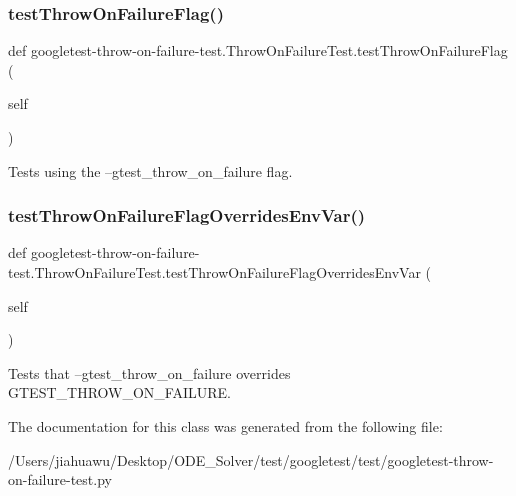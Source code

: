 \subsubsection{\texorpdfstring{test\+Throw\+On\+Failure\+Flag()}{testThrowOnFailureFlag()}}
{\footnotesize\ttfamily def googletest-\/throw-\/on-\/failure-\/test.\+Throw\+On\+Failure\+Test.\+test\+Throw\+On\+Failure\+Flag (\begin{DoxyParamCaption}\item[{}]{self }\end{DoxyParamCaption})}

\begin{DoxyVerb}Tests using the --gtest_throw_on_failure flag.\end{DoxyVerb}
 \mbox{\label{classgoogletest-throw-on-failure-test_1_1_throw_on_failure_test_a18515553dbfe7b3e6ed6449fa81893c1}} 
\subsubsection{\texorpdfstring{test\+Throw\+On\+Failure\+Flag\+Overrides\+Env\+Var()}{testThrowOnFailureFlagOverridesEnvVar()}}
{\footnotesize\ttfamily def googletest-\/throw-\/on-\/failure-\/test.\+Throw\+On\+Failure\+Test.\+test\+Throw\+On\+Failure\+Flag\+Overrides\+Env\+Var (\begin{DoxyParamCaption}\item[{}]{self }\end{DoxyParamCaption})}

\begin{DoxyVerb}Tests that --gtest_throw_on_failure overrides GTEST_THROW_ON_FAILURE.\end{DoxyVerb}
 

The documentation for this class was generated from the following file\+:\begin{DoxyCompactItemize}
\item 
/\+Users/jiahuawu/\+Desktop/\+O\+D\+E\+\_\+\+Solver/test/googletest/test/googletest-\/throw-\/on-\/failure-\/test.\+py\end{DoxyCompactItemize}
